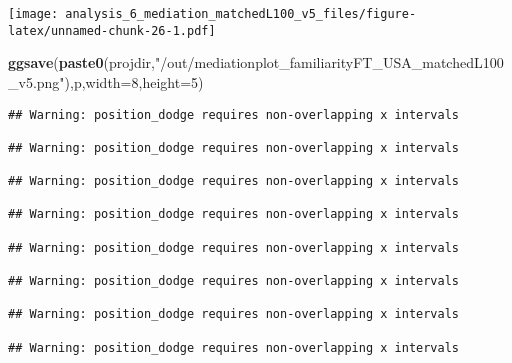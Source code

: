 \documentclass[
]{article}
\newenvironment{Shaded}{\begin{snugshade}}{\end{snugshade}}
\newcommand{\DataTypeTok}[1]{\textcolor[rgb]{0.13,0.29,0.53}{#1}}
\newcommand{\DecValTok}[1]{\textcolor[rgb]{0.00,0.00,0.81}{#1}}
\newcommand{\KeywordTok}[1]{\textcolor[rgb]{0.13,0.29,0.53}{\textbf{#1}}}
\newcommand{\NormalTok}[1]{#1}
\newcommand{\StringTok}[1]{\textcolor[rgb]{0.31,0.60,0.02}{#1}}
\begin{document}
\texttt{[image: analysis\_6\_mediation\_matchedL100\_v5\_files/figure-latex/unnamed-chunk-26-1.pdf]}

\begin{Shaded}
\begin{Highlighting}[]
\KeywordTok{ggsave}\NormalTok{(}\KeywordTok{paste0}\NormalTok{(projdir,}\StringTok{"/out/mediationplot_familiarityFT_USA_matchedL100_v5.png"}\NormalTok{),p,}\DataTypeTok{width=}\DecValTok{8}\NormalTok{,}\DataTypeTok{height=}\DecValTok{5}\NormalTok{)}
\end{Highlighting}
\end{Shaded}

\begin{verbatim}
## Warning: position_dodge requires non-overlapping x intervals

## Warning: position_dodge requires non-overlapping x intervals

## Warning: position_dodge requires non-overlapping x intervals

## Warning: position_dodge requires non-overlapping x intervals

## Warning: position_dodge requires non-overlapping x intervals

## Warning: position_dodge requires non-overlapping x intervals

## Warning: position_dodge requires non-overlapping x intervals

## Warning: position_dodge requires non-overlapping x intervals
\end{verbatim}
\end{document}
